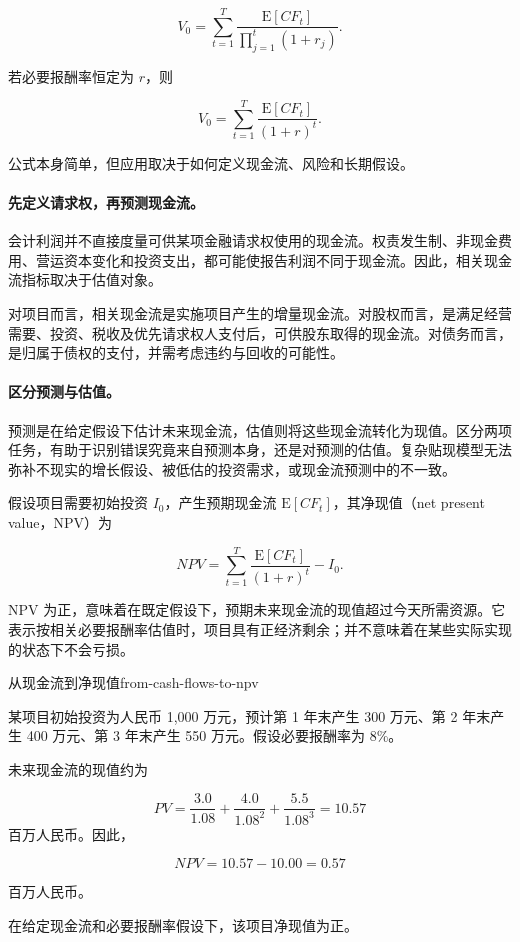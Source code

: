 \begin{equation}
V_0 = \sum_{t=1}^{T}
\frac{\mathrm{E}[CF_t]}
{\prod_{j=1}^{t}(1+r_j)}.
\label{eq:ch5-general-dcf}
\end{equation}

若必要报酬率恒定为 $r$，则

\begin{equation}
V_0=\sum_{t=1}^{T}
\frac{\mathrm{E}[CF_t]}{(1+r)^t}.
\label{eq:ch5-constant-dcf}
\end{equation}

公式本身简单，但应用取决于如何定义现金流、风险和长期假设。

\paragraph{先定义请求权，再预测现金流。}

会计利润并不直接度量可供某项金融请求权使用的现金流。权责发生制、非现金费用、营运资本变化和投资支出，都可能使报告利润不同于现金流。因此，相关现金流指标取决于估值对象。

对项目而言，相关现金流是实施项目产生的增量现金流。对股权而言，是满足经营需要、投资、税收及优先请求权人支付后，可供股东取得的现金流。对债务而言，是归属于债权的支付，并需考虑违约与回收的可能性。







\paragraph{区分预测与估值。}

预测是在给定假设下估计未来现金流，估值则将这些现金流转化为现值。区分两项任务，有助于识别错误究竟来自预测本身，还是对预测的估值。复杂贴现模型无法弥补不现实的增长假设、被低估的投资需求，或现金流预测中的不一致。

假设项目需要初始投资 $I_0$，产生预期现金流 $\mathrm{E}[CF_t]$，其净现值（net present value，NPV）为

\begin{equation}
NPV=\sum_{t=1}^{T}
\frac{\mathrm{E}[CF_t]}{(1+r)^t}-I_0.
\label{eq:ch5-npv}
\end{equation}

NPV 为正，意味着在既定假设下，预期未来现金流的现值超过今天所需资源。它表示按相关必要报酬率估值时，项目具有正经济剩余；并不意味着在某些实际实现的状态下不会亏损。

\begin{example}{从现金流到净现值}{from-cash-flows-to-npv}


某项目初始投资为人民币 1,000 万元，预计第 1 年末产生 300 万元、第 2 年末产生 400 万元、第 3 年末产生 550 万元。假设必要报酬率为 8\%。

未来现金流的现值约为

$$
PV=\frac{3.0}{1.08}+\frac{4.0}{1.08^2}+\frac{5.5}{1.08^3}=10.57
$$
百万人民币。因此，

$$
NPV=10.57-10.00=0.57
$$

百万人民币。

在给定现金流和必要报酬率假设下，该项目净现值为正。

\end{example}

